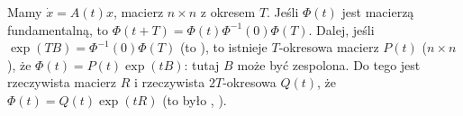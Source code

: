 Mamy  $\dot x = A(t)x$, macierz $n \times n$ z okresem $T$.
Jeśli $\Phi(t)$ jest macierzą fundamentalną, to $\Phi(t+T) = \Phi(t) \Phi^{-1}(0)\Phi(T)$.
Dalej, jeśli $\exp(TB) = \Phi^{-1}(0)\Phi(T)$ (to ), to istnieje $T$-okresowa macierz $P(t)$ ($n \times n$), że $\Phi(t) = P(t) \exp(tB)$: tutaj $B$ może być zespolona.
Do tego jest rzeczywista macierz $R$ i rzeczywista $2T$-okresowa $Q(t)$, że $\Phi(t) = Q(t)\exp(tR)$ (to było , ).

